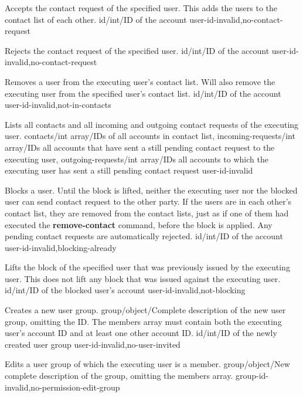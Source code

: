\documentclass[parskip=full,11pt]{scrartcl}
\begin{document}
{Accepts the contact request of the specified user.
This adds the users to the contact list of each other.}
{id/int/ID of the account}
{}
{user-id-invalid,no-contact-request}
{}

{Rejects the contact request of the specified user.}
{id/int/ID of the account}
{}
{user-id-invalid,no-contact-request}
{}

{Removes a user from the executing user's contact list.
Will also remove the executing user from the specified user's contact list.}
{id/int/ID of the account}
{}
{user-id-invalid,not-in-contacts}
{}

{Lists all contacts and all incoming and outgoing contact requests of the
executing user.}
{}
{contacts/int array/IDs of all accounts in contact list,
incoming-requests/int array/IDs all accounts that have sent a still pending
contact request to the executing user,
outgoing-requests/int array/IDs all accounts to which the executing user has
sent a still pending contact request}
{}
{user-id-invalid}

{Blocks a user.
Until the block is lifted, neither the executing user nor the blocked user can
send contact request to the other party.
If the users are in each other's contact list, they are removed from the
contact lists, just as if one of them had executed the \textbf{remove-contact}
command, before the block is applied.
Any pending contact requests are automatically rejected.}
{id/int/ID of the account}
{}
{user-id-invalid,blocking-already}
{}

{Lifts the block of the specified user that was previously issued by the
executing user.
This does not lift any block that was issued against the executing user.}
{id/int/ID of the blocked user's account}
{}
{user-id-invalid,not-blocking}
{}

{Creates a new user group.}
{group/object/Complete description of the new user group{,} omitting the ID.
The members array must contain both the executing user's account ID and at
least one other account ID.}
{id/int/ID of the newly created user group}
{user-id-invalid,no-user-invited}
{}

{Edits a user group of which the executing user is a member.}
{group/object/New complete description of the group{,} omitting the members
array.}
{}
{group-id-invalid,no-permission-edit-group}
{}
\end{document}
